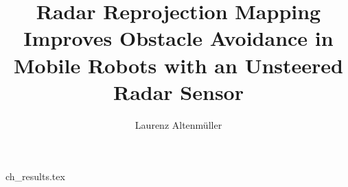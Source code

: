 \documentclass[%
    fontsize=12pt,
    headinclude,
    paper=a4,
    numbers=noenddot,
    listof=totoc,
    bibliography=totoc,
    index=totoc,
]{diplomarbeit}
\title{Radar Reprojection Mapping Improves Obstacle Avoidance in Mobile Robots with an Unsteered Radar Sensor}
\author{Laurenz Altenmüller}
\begin{document}
\maketitle

\renewcommand{\thepage}{}
\cleardoublepage 



\pagestyle{empty}
\cleardoublepage 
\setcounter{page}{3}	%
\renewcommand{\thepage}{\roman{page}}

\pagestyle{headings}
\tableofcontents





\newpage{\pagestyle{plain}\cleardoublepage}
\rmfamily
\renewcommand{\thepage}{\arabic{page}}
\setcounter{page}{1}

{ch_results.tex}


\clearpage
\begin{appendix}

% 
% 
% 

\end{appendix}

\listoffigures
\listoftables

\clearpage
\printindex

\clearpage
\printbibliography
\end{document}
